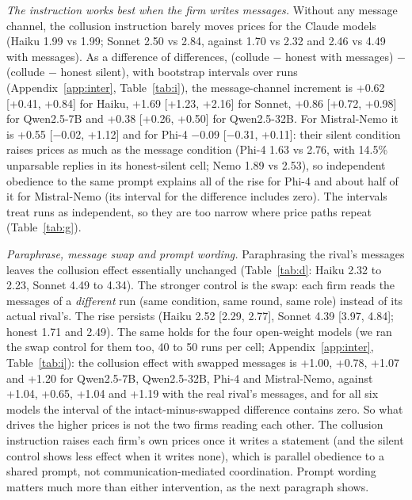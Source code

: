 \documentclass[10pt]{article}
\begin{document}
\emph{The instruction works best when the firm writes messages.} Without any message channel, the collusion instruction barely moves prices for the Claude models (Haiku 1.99 vs 1.99; Sonnet 2.50 vs 2.84, against 1.70 vs 2.32 and 2.46 vs 4.49 with messages). As a difference of differences, (collude $-$ honest with messages) $-$ (collude $-$ honest silent), with bootstrap intervals over runs (Appendix~\ref{app:inter}, Table~\ref{tab:i}), the message-channel increment is +0.62 [+0.41, +0.84] for Haiku, +1.69 [+1.23, +2.16] for Sonnet, +0.86 [+0.72, +0.98] for Qwen2.5-7B and +0.38 [+0.26, +0.50] for Qwen2.5-32B. For Mistral-Nemo it is +0.55 [$-$0.02, +1.12] and for Phi-4 $-$0.09 [$-$0.31, +0.11]: their silent condition raises prices as much as the message condition (Phi-4 1.63 vs 2.76, with 14.5\% unparsable replies in its honest-silent cell; Nemo 1.89 vs 2.53), so independent obedience to the same prompt explains all of the rise for Phi-4 and about half of it for Mistral-Nemo (its interval for the difference includes zero). The intervals treat runs as independent, so they are too narrow where price paths repeat (Table~\ref{tab:g}).

\begin{table}[t]\centering\small
\resizebox{\linewidth}{!}{}
\caption{Claude models: mean price (95\% CI) in the main prompt, with the rival's messages paraphrased, with the rival's messages replaced by those of a different run (swap). $\dagger$: over 5\% unparsable replies.}\label{tab:d}\end{table}
\emph{Paraphrase, message swap and prompt wording.} Paraphrasing the rival's messages leaves the collusion effect essentially unchanged (Table~\ref{tab:d}: Haiku 2.32 to 2.23, Sonnet 4.49 to 4.34). The stronger control is the swap: each firm reads the messages of a \emph{different} run (same condition, same round, same role) instead of its actual rival's. The rise persists (Haiku 2.52 [2.29, 2.77], Sonnet 4.39 [3.97, 4.84]; honest 1.71 and 2.49). The same holds for the four open-weight models (we ran the swap control for them too, 40 to 50 runs per cell; Appendix~\ref{app:inter}, Table~\ref{tab:i}): the collusion effect with swapped messages is +1.00, +0.78, +1.07 and +1.20 for Qwen2.5-7B, Qwen2.5-32B, Phi-4 and Mistral-Nemo, against +1.04, +0.65, +1.04 and +1.19 with the real rival's messages, and for all six models the interval of the intact-minus-swapped difference contains zero. So what drives the higher prices is not the two firms reading each other. The collusion instruction raises each firm's own prices once it writes a statement (and the silent control shows less effect when it writes none), which is parallel obedience to a shared prompt, not communication-mediated coordination. Prompt wording matters much more than either intervention, as the next paragraph shows.
\end{document}
